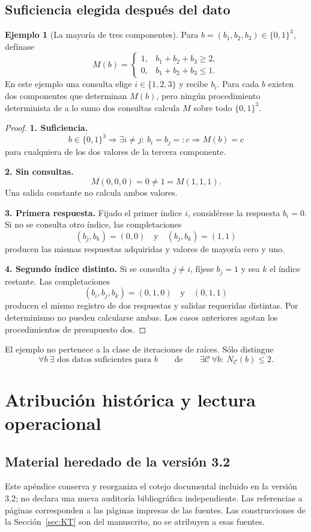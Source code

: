 \documentclass[11pt,a4paper]{article}
\numberwithin{equation}{section}
\theoremstyle{definition}
\newtheorem{example}[theorem]{Ejemplo}
\theoremstyle{remark}
\newcommand{\paso}[1]{\par\smallskip\noindent\textbf{#1}\quad}
\begin{document}
\subsection{Suficiencia elegida después del dato}
\begin{example}[La mayoría de tres componentes]\label{ex:majority}
Para $b=(b_1,b_2,b_3)\in\{0,1\}^3$, defínase
\[
M(b)=\begin{cases}1,&b_1+b_2+b_3\ge2,\\0,&b_1+b_2+b_3\le1.\end{cases}
\]
En este ejemplo una consulta elige $i\in\{1,2,3\}$ y recibe $b_i$. Para cada $b$ existen dos componentes que determinan $M(b)$, pero ningún procedimiento determinista de a lo sumo dos consultas calcula $M$ sobre todo $\{0,1\}^3$.
\begin{proof}
\paso{1. Suficiencia.}
\[
b\in\{0,1\}^3\Longrightarrow\exists i\ne j:\ b_i=b_j=:c
\Longrightarrow M(b)=c
\]
para cualquiera de los dos valores de la tercera componente.
\paso{2. Sin consultas.}
\[
M(0,0,0)=0\ne1=M(1,1,1).
\]
Una salida constante no calcula ambos valores.
\paso{3. Primera respuesta.}
Fijado el primer índice $i$, considérese la respuesta $b_i=0$. Si no se consulta otro índice, las completaciones
\[
(b_j,b_k)=(0,0)\quad\text{y}\quad(b_j,b_k)=(1,1)
\]
producen las mismas respuestas adquiridas y valores de mayoría cero y uno.
\paso{4. Segundo índice distinto.}
Si se consulta $j\ne i$, fíjese $b_j=1$ y sea $k$ el índice restante. Las completaciones
\[
(b_i,b_j,b_k)=(0,1,0)\quad\text{y}\quad(0,1,1)
\]
producen el mismo registro de dos respuestas y salidas requeridas distintas. Por determinismo no pueden calcularse ambas. Los casos anteriores agotan los procedimientos de presupuesto dos.
\end{proof}
El ejemplo no pertenece a la clase de iteraciones de raíces. Sólo distingue
\[
\forall b\ \exists\text{ dos datos suficientes para }b
\qquad\text{de}\qquad
\exists\mathscr C\ \forall b:\ N_{\mathscr C}(b)\le2.
\]
\end{example}

\clearpage
\section{Atribución histórica y lectura operacional}\label{app:documentary}

\subsection{Material heredado de la versión 3.2}\label{subsec:KTsource}
Este apéndice conserva y reorganiza el cotejo documental incluido en la versión 3.2; no declara una nueva auditoría bibliográfica independiente. Las referencias a páginas corresponden a las páginas impresas de las fuentes. Las construcciones de la Sección~\ref{sec:KT} son del manuscrito, no se atribuyen a esas fuentes.
\end{document}

